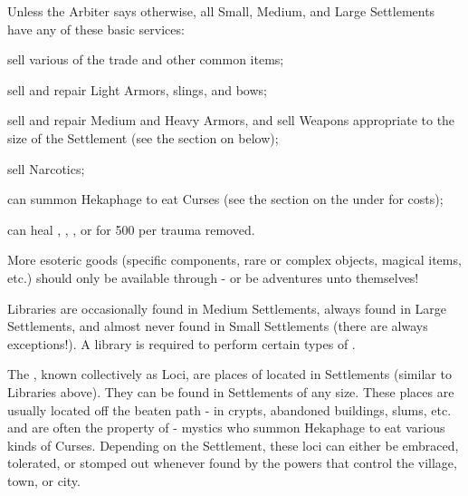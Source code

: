 

  Unless the Arbiter says otherwise, all Small, Medium, and Large Settlements have any of these basic services:

   sell various  of the trade and other common items;

   sell and repair Light Armors, slings, and bows;

   sell and repair Medium and Heavy Armors, and sell Weapons  appropriate to the size of the Settlement (see the section on  below);

   sell Narcotics; 


   can summon Hekaphage to eat Curses (see the section on the  under  for costs);


    can heal , , , or  for 500 \AG per trauma removed.


More esoteric goods (specific components, rare or complex objects, magical items, etc.) should only be available through  - or be adventures unto themselves!


Libraries are occasionally found in Medium Settlements, always found in Large Settlements, and almost never found in Small Settlements (there are always exceptions!). A library is required to perform certain types of .


The , known collectively as Loci, are places of  located in Settlements (similar to Libraries above).  They can be found in Settlements of any size.  These places are usually located off the beaten path - in crypts, abandoned buildings, slums, etc. and are often the property of  - mystics who summon Hekaphage to eat various kinds of Curses. Depending on the Settlement, these loci can either be embraced, tolerated, or stomped out whenever found by the powers that control the village, town, or city. 

